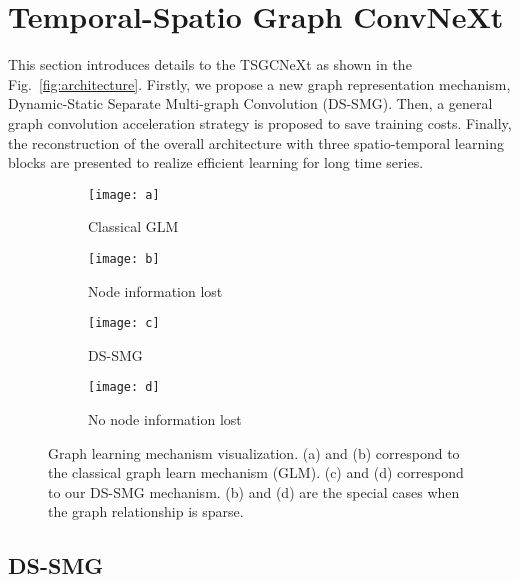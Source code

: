 \documentclass[10pt,twocolumn,letterpaper]{article}
\begin{document}
\section{Temporal-Spatio Graph ConvNeXt}
This section introduces details to the TSGCNeXt as shown in the Fig.~\ref{fig:architecture}.
Firstly, we propose a new graph representation mechanism, Dynamic-Static Separate Multi-graph Convolution (DS-SMG).
Then, a general graph convolution acceleration strategy is proposed to save training costs.
Finally, the reconstruction of the overall architecture with three spatio-temporal learning blocks are presented to realize efficient learning for long time series.


\begin{figure*}\centering
    \begin{subfigure}[b]{0.22\textwidth}
         \centering
         \texttt{[image: a]}
         \caption{Classical GLM}
         \label{(a)}
    \end{subfigure}
    \begin{subfigure}[b]{0.22\textwidth}
         \centering
         \texttt{[image: b]}
         \caption{Node information lost}
         \label{(b)}
    \end{subfigure}
    \begin{subfigure}[b]{0.22\textwidth}
         \centering
         \texttt{[image: c]}
         \caption{DS-SMG}
         \label{(c)}
    \end{subfigure}
    \begin{subfigure}[b]{0.22\textwidth}
         \centering
         \texttt{[image: d]}
         \caption{No node information lost}
         \label{(d)}
    \end{subfigure}
    \caption{Graph learning mechanism visualization. (a) and (b) correspond to the classical graph learn mechanism (GLM). (c) and (d) correspond to our DS-SMG mechanism. (b) and (d) are the special cases when the graph relationship is sparse.} \label{fig:complexity}
    \vspace{-1em}
\end{figure*}
\subsection{DS-SMG}
\label{ssec:smc}
\end{document}
